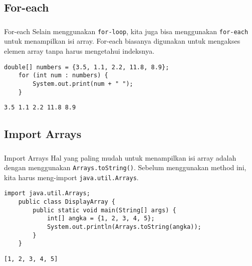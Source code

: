 \documentclass[aspectratio=169]{beamer}
\theoremstyle{definition}
\begin{document}
    \subsection{For-each}
    \begin{frame}[fragile]
        \frametitle{\insertsection}
        \framesubtitle{\insertsubsection}
        \begin{block}{For-each}
            Selain menggunakan \texttt{for-loop}, kita juga bisa menggunakan \texttt{for-each} untuk menampilkan isi array. For-each biasanya digunakan untuk mengakses elemen array tanpa harus mengetahui indeksnya.
        \end{block}
        \begin{lstlisting}[caption={Menampilkan array dengan for-each}]
    double[] numbers = {3.5, 1.1, 2.2, 11.8, 8.9};
    for (int num : numbers) {
        System.out.print(num + " ");
    }
        \end{lstlisting}
        \begin{lstlisting}[style=output]
    3.5 1.1 2.2 11.8 8.9
        \end{lstlisting}
    \end{frame}

    \subsection{Import Arrays}
    \begin{frame}[fragile]
        \frametitle{\insertsection}
        \framesubtitle{\insertsubsection}
        \begin{block}{Import Arrays}
            Hal yang paling mudah untuk menampilkan isi array adalah dengan menggunakan \texttt{Arrays.toString()}. Sebelum menggunakan method ini, kita harus meng-import \texttt{java.util.Arrays}.
        \end{block}
        \begin{lstlisting}[caption={Arrays.toString()}]
    import java.util.Arrays;
    public class DisplayArray {
        public static void main(String[] args) {
            int[] angka = {1, 2, 3, 4, 5};
            System.out.println(Arrays.toString(angka));
        }
    }
        \end{lstlisting}
        \begin{lstlisting}[style=output]
    [1, 2, 3, 4, 5]
        \end{lstlisting}
    \end{frame}
\end{document}
